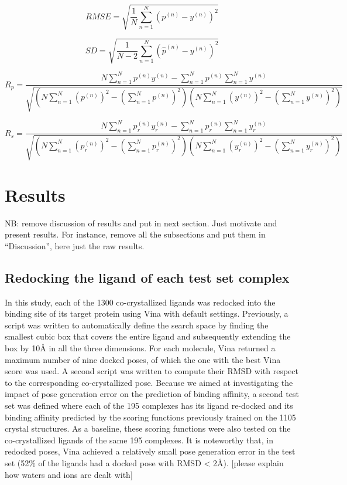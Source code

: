 \documentclass[twocolumn]{bmcart}
\begin{document}
\begin{equation}
RMSE = \sqrt{\frac{1}{N}\sum_{n=1}^N(p^{(n)}-y^{(n)})^2}
\label{eqn:rmse}
\end{equation}

\begin{equation}
SD = \sqrt{\frac{1}{N-2}\sum_{n=1}^N(\hat{p}^{(n)}-y^{(n)})^2}
\label{eqn:sdev}
\end{equation}

\begin{equation}
R_p = \frac{N\sum_{n=1}^Np^{(n)}y^{(n)}-\sum_{n=1}^Np^{(n)}\sum_{n=1}^Ny^{(n)}}{\sqrt{(N\sum_{n=1}^N(p^{(n)})^2-(\sum_{n=1}^Np^{(n)})^2)(N\sum_{n=1}^N(y^{(n)})^2-(\sum_{n=1}^Ny^{(n)})^2)}}
\label{eqn:pcor}
\end{equation}

\begin{equation}
R_s = \frac{N\sum_{n=1}^Np_r^{(n)}y_r^{(n)}-\sum_{n=1}^Np_r^{(n)}\sum_{n=1}^Ny_r^{(n)}}{\sqrt{(N\sum_{n=1}^N(p_r^{(n)})^2-(\sum_{n=1}^Np_r^{(n)})^2)(N\sum_{n=1}^N(y_r^{(n)})^2-(\sum_{n=1}^Ny_r^{(n)})^2)}}
\label{eqn:scor}
\end{equation}

\section*{Results}

NB: remove discussion of results and put in next section. Just motivate and present results. For instance, remove all the subsections and put them in “Discussion”, here just the raw results. 

\subsection*{Redocking the ligand of each test set complex}

In this study, each of the 1300 co-crystallized ligands was redocked into the binding site of its target protein using Vina with default settings. Previously, a script was written to automatically define the search space by finding the smallest cubic box that covers the entire ligand and subsequently extending the box by 10Å in all the three dimensions. For each molecule, Vina returned a maximum number of nine docked poses, of which the one with the best Vina score was used. A second script was written to compute their RMSD with respect to the corresponding co-crystallized pose. Because we aimed at investigating the impact of pose generation error on the prediction of binding affinity, a second test set was defined where each of the 195 complexes has its ligand re-docked and its binding affinity predicted by the scoring functions previously trained on the 1105 crystal structures. As a baseline, these scoring functions were also tested on the co-crystallized ligands of the same 195 complexes. It is noteworthy that, in redocked poses, Vina achieved a relatively small pose generation error in the test set (52\% of the ligands had a docked pose with RMSD < 2\AA). [please explain how waters and ions are dealt with]
\end{document}
